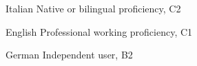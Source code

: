 
\begin{cvskills}

  \cvskill
  {Italian} %
  {Native or bilingual proficiency, C2} %

  \cvskill
  {English} %
  {Professional working proficiency, C1} %

  \cvskill
  {German} %
  {Independent user, B2} %

\end{cvskills}
